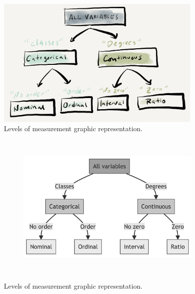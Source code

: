 \documentclass[
  letterpaper,
]{latex/krantz}
\begin{document}
\begin{figure}[h]

{\centering \includegraphics[width=0.9\textwidth,height=\textheight]{./figures/approaching-analysis/Informational-values-paper.png}

}

\caption{\label{fig-info-values-paper}Levels of measurement graphic
representation.}

\end{figure}

\begin{figure}

{\centering 

\begin{figure}[H]

{\centering \includegraphics[width=4.68in,height=2.82in]{./approaching-analysis_files/figure-latex/mermaid-figure-1.png}

}

\end{figure}

}

\caption{\label{fig-intro-values}Levels of measurement graphic
representation.}

\end{figure}
\end{document}

